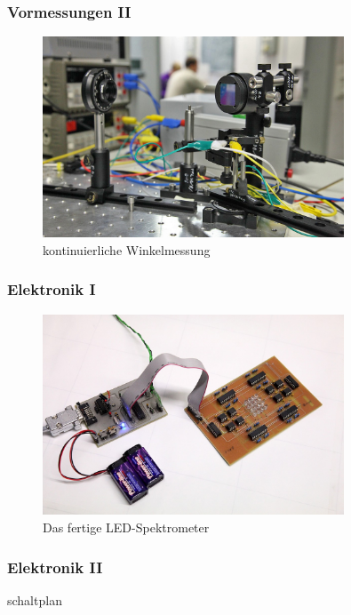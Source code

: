 \documentclass[10pt]{beamer}
\begin{document}
{
\frametitle{Vormessungen II}
\begin{figure}
\begin{center}
\includegraphics[width=0.8\textwidth]{./images/prIMG_7244bh}
\caption{kontinuierliche Winkelmessung}
\end{center}
\end{figure}
}
\frame
{
\frametitle{Elektronik I}
\begin{figure}
\begin{center}
\includegraphics[width=0.8\textwidth]{./images/elektronik-final.jpg}
\caption{Das fertige LED-Spektrometer}
\end{center}
\end{figure}
}
\frame
{
\frametitle{Elektronik II}
schaltplan
}
\frame
\end{document}
